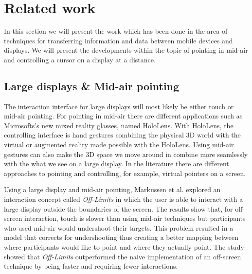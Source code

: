 \section{Related work} \label{sec:relatedwork}
In this section we will present the work which has been done in the area of techniques for transferring information and data between mobile devices and displays.
We will present the developments within the topic of pointing in mid-air and controlling a cursor on a display at a distance.

\subsection{Large displays \& Mid-air pointing} \label{sec:largeDisplayAirPointing}
The interaction interface for large displays will most likely be either touch or mid-air pointing.
For pointing in mid-air there are different applications such as Microsofts's new mixed reality glasses, named HoloLens.
With HoloLens, the controlling interface is hand gestures combining the physical 3D world with the virtual or augmented reality made possible with the HoloLens.
Using mid-air gestures can also make the 3D space we move around in combine more seamlessly with the what we see on a large display.
In the literature there are different approaches to pointing and controlling, for example, virtual pointers on a screen. 

Using a large display and mid-air pointing, Markussen et al. \cite{Markussen:2016} explored an interaction concept called \emph{Off-Limits} in which the user is able to interact with a large display outside the boundaries of the screen.
The results show that, for off-screen interaction, touch is slower than using mid-air techniques but participants who used mid-air would undershoot their targets.
This problem resulted in a model that corrects for undershooting thus creating a better mapping between where participants would like to point and where they actually point.
The study showed that \emph{Off-Limits} outperformed the naive implementation of an off-screen technique by being faster and requiring fewer interactions.

